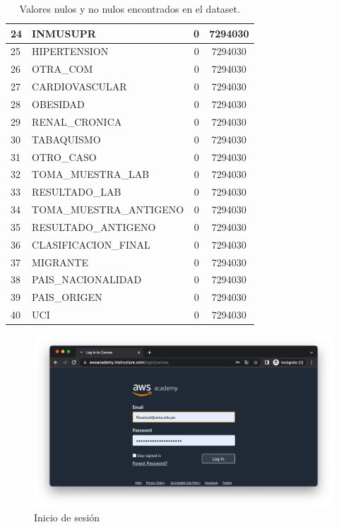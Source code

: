 \begin{table}[h]
{\begin{tabular}{|l|l|c|c|}
24 & INMUSUPR                & 0 & 7294030 \\ \hline
25 & HIPERTENSION            & 0 & 7294030 \\ \hline
26 & OTRA\_COM               & 0 & 7294030 \\ \hline
27 & CARDIOVASCULAR          & 0 & 7294030 \\ \hline
28 & OBESIDAD                & 0 & 7294030 \\ \hline
29 & RENAL\_CRONICA          & 0 & 7294030 \\ \hline
30 & TABAQUISMO              & 0 & 7294030 \\ \hline
31 & OTRO\_CASO              & 0 & 7294030 \\ \hline
32 & TOMA\_MUESTRA\_LAB      & 0 & 7294030 \\ \hline
33 & RESULTADO\_LAB          & 0 & 7294030 \\ \hline
34 & TOMA\_MUESTRA\_ANTIGENO & 0 & 7294030 \\ \hline
35 & RESULTADO\_ANTIGENO     & 0 & 7294030 \\ \hline
36 & CLASIFICACION\_FINAL    & 0 & 7294030 \\ \hline
37 & MIGRANTE                & 0 & 7294030 \\ \hline
38 & PAIS\_NACIONALIDAD      & 0 & 7294030 \\ \hline
39 & PAIS\_ORIGEN            & 0 & 7294030 \\ \hline
40 & UCI                     & 0 & 7294030 \\ \hline
\end{tabular}
}
\caption{Valores nulos y no nulos encontrados en el dataset.}
\label{tabla:autores}
\end{table}




\clearpage
\begin{figure}[h]
	\centering
	\includegraphics[scale=.3] {img/00-login}
	\caption{Inicio de sesión}
	\label{fig:0}	
\end{figure}

